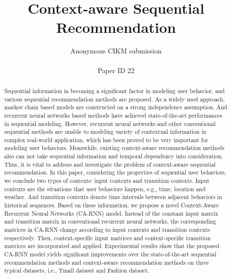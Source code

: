 \documentclass{sig-alternate}
\begin{document}
\title{Context-aware Sequential Recommendation}

\author{
        Anonymous CIKM submission\\
        \\
        Paper ID 22
       }
\maketitle


\begin{abstract}
Sequential information ia becoming a significant factor in modeling user behavior, and various sequential recommendation methods are proposed. As a widely used approach, markov chain based models are constructed on a strong independence assumption. And recurrent neural networks based methods have achieved state-of-the-art performances in sequential modeling. However, recurrent neural networks and other conventional sequential methods are unable to modeling variety of contextual information in complex real-world application, which has been proved to be very important for modeling user behaviors. Meanwhile, existing context-aware recommendation methods also can not take sequential information and temporal dependency into consideration. Thus, it is vital to address and investigate the problem of context-aware sequential recommendation. In this paper, considering the properties of sequential user behaviors, we conclude two types of contexts: input contexts and transition contexts. Input contexts are the situations that user behaviors happen, e.g., time, location and weather. And transition contexts denote time intervals between adjacent behaviors in historical sequences. Based on these information, we propose a novel Context-Aware Recurrent Neural Networks (CA-RNN) model. Instead of the constant input matrix and transition matrix in conventional recurrent neural networks, the corresponding matrices in CA-RNN change according to input contexts and transition contexts respectively. Then, context-specific input matrices and context-specific transition matrices are incorporated and applied. Experimental results show that the proposed CA-RNN model yields significant improvements over the state-of-the-art sequential recommendation methods and context-aware recommendation methods on three typical datasets, i.e., Tmall dataset and Fashion dataset.
\end{abstract}
\end{document}

